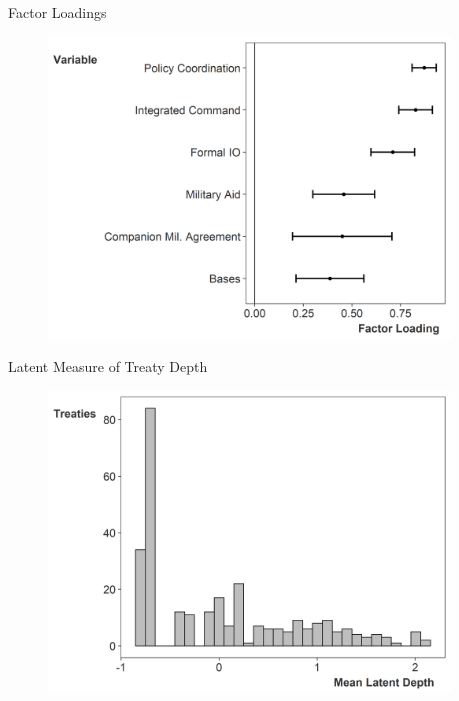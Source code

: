 \documentclass[12pt]{beamer}
\begin{document}
\begin{frame}{Factor Loadings}


\begin{figure}
	\centering
		\includegraphics[width=0.95\textwidth]{factor-loadings.png}
\end{figure}


\end{frame}


\begin{frame}{Latent Measure of Treaty Depth}

\begin{figure}[htbp]
	\centering
		\includegraphics[width=0.95\textwidth]{ld-hist.png}
\end{figure}


\end{frame} 
\end{document}
